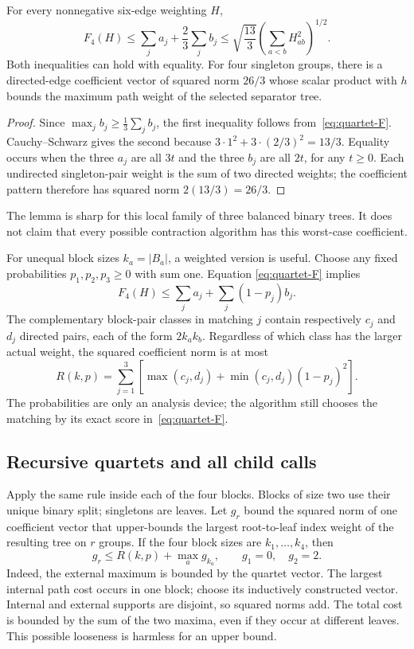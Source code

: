 \begin{lemma}\label{lem:quartet}
For every nonnegative six-edge weighting $H$,
\[
 F_4(H)\le\sum_j a_j+\frac23\sum_j b_j
 \le\sqrt{\frac{13}{3}}\left(\sum_{a<b}H_{ab}^2\right)^{1/2}.
\]
Both inequalities can hold with equality. For four singleton groups,
there is a directed-edge coefficient vector of squared norm $26/3$
whose scalar product with $h$ bounds the maximum path weight of the
selected separator tree.
\end{lemma}
\begin{proof}
Since $\max_j b_j\ge\frac13\sum_j b_j$, the first inequality follows
from~\eqref{eq:quartet-F}. Cauchy--Schwarz gives the second because
$3\cdot1^2+3\cdot(2/3)^2=13/3$. Equality occurs when the three $a_j$
are all $3t$ and the three $b_j$ are all $2t$, for any $t\ge0$.
Each undirected singleton-pair weight is the sum of two directed weights;
the coefficient pattern therefore has squared norm $2(13/3)=26/3$.
\end{proof}

The lemma is sharp for this local family of three balanced binary trees.
It does not claim that every possible contraction algorithm has this
worst-case coefficient.

For unequal block sizes $k_a=|B_a|$, a weighted version is useful. Choose
any fixed probabilities $p_1,p_2,p_3\ge0$ with sum one. Equation
\eqref{eq:quartet-F} implies
\[
 F_4(H)\le\sum_j a_j+\sum_j(1-p_j)b_j.
\]
The complementary block-pair classes in matching $j$ contain respectively
$c_j$ and $d_j$ directed pairs, each of the form $2k_ak_b$. Regardless of
which class has the larger actual weight, the squared coefficient norm
is at most
\begin{equation}\label{eq:quartet-unequal}
 R(k,p)=\sum_{j=1}^3\left[
 \max(c_j,d_j)+\min(c_j,d_j)(1-p_j)^2\right].
\end{equation}
The probabilities are only an analysis device; the algorithm still
chooses the matching by its exact score in~\eqref{eq:quartet-F}.

\subsection{Recursive quartets and all child calls}

Apply the same rule inside each of the four blocks. Blocks of size two
use their unique binary split; singletons are leaves. Let $g_r$ bound
the squared norm of one coefficient vector that upper-bounds the largest
root-to-leaf index weight of the resulting tree on $r$ groups. If the
four block sizes are $k_1,\ldots,k_4$, then
\begin{equation}\label{eq:quartet-g-recurrence}
 g_r\le R(k,p)+\max_a g_{k_a},\qquad g_1=0,\quad g_2=2.
\end{equation}
Indeed, the external maximum is bounded by the quartet vector. The
largest internal path cost occurs in one block; choose its inductively
constructed vector. Internal and external supports are disjoint, so
squared norms add. The total cost is bounded by the sum of the two
maxima, even if they occur at different leaves. This possible
looseness is harmless for an upper bound.

